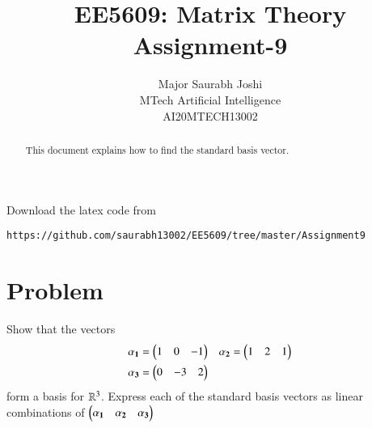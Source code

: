 \documentclass[journal,12pt,twocolumn]{IEEEtran}
\begin{document}
\renewcommand{\thefigure}{\theproblem}

\def\putbox#1#2#3{\makebox[0in][l]{\makebox[#1][l]{}\raisebox{\baselineskip}[0in][0in]{\raisebox{#2}[0in][0in]{#3}}}}
     \def\rightbox#1{\makebox[0in][r]{#1}}
     \def\centbox#1{\makebox[0in]{#1}}
     \def\topbox#1{\raisebox{-\baselineskip}[0in][0in]{#1}}
     \def\midbox#1{\raisebox{-0.5\baselineskip}[0in][0in]{#1}}
\vspace{3cm}
\title{EE5609: Matrix Theory\\Assignment-9}
\author{Major Saurabh Joshi\\MTech Artificial Intelligence\\AI20MTECH13002 }
\maketitle

\bigskip
\renewcommand{\thefigure}{\theenumi}
\renewcommand{\thetable}{\theenumi}
\begin{abstract}
This document explains how to find the standard basis vector. 
\end{abstract}
Download the latex code from 
%
%
%
\begin{lstlisting}
https://github.com/saurabh13002/EE5609/tree/master/Assignment9
\end{lstlisting}
%
\section{Problem}
Show that the vectors 
\begin{align}
& \mathbf{\alpha_1} = \begin{pmatrix}1 & 0 & -1\end{pmatrix} & \mathbf{\alpha_2} = \begin{pmatrix}1 & 2 & 1 \end{pmatrix} \\
& \mathbf{\alpha_3} = \begin{pmatrix}0 & -3 & 2\end{pmatrix}
\end{align}
form a basis for $\mathbb{R}^3$. Express each of the standard basis vectors as linear combinations
of $\begin{pmatrix}\mathbf{\alpha_1} &  \mathbf{\alpha_2} & \mathbf{\alpha_3}\end{pmatrix}$
\end{document}

